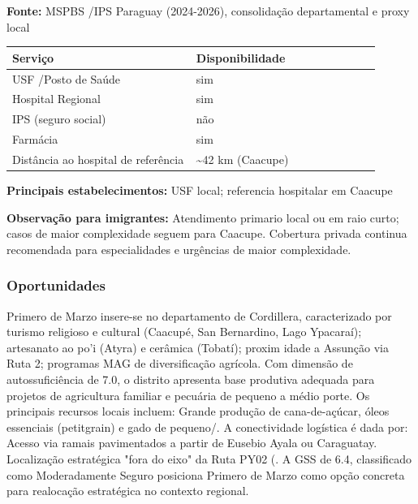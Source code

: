 \textbf{Fonte:} MSPBS /\allowbreak  IPS Paraguay (2024-2026), consolidação
departamental e proxy local

{\def\LTcaptype{none} %
\begin{longtable}{@{}>{\raggedright\arraybackslash}p{0.45\linewidth} >{\raggedright\arraybackslash}p{0.45\linewidth}@{}}
\toprule\noalign{}
Serviço & Disponibilidade \\
\midrule\noalign{}
\endhead
\bottomrule\noalign{}
\endlastfoot
USF /\allowbreak  Posto de Saúde & sim \\
Hospital Regional & sim \\
IPS (seguro social) & não \\
Farmácia & sim \\
Distância ao hospital de referência & \textasciitilde42 km (Caacupe) \\
\end{longtable}
}

\textbf{Principais estabelecimentos:} USF local; referencia hospitalar
em Caacupe

\textbf{Observação para imigrantes:} Atendimento primario local ou em
raio curto; casos de maior complexidade seguem para Caacupe. Cobertura
privada continua recomendada para especialidades e urgências de maior
complexidade.
\newpage

\subsubsection*{Oportunidades}\label{oport-primero-de-marzo-0315}
Primero de Marzo insere-se no departamento de Cordillera, caracterizado por turismo religioso e cultural (Caacupé, San Bernardino, Lago Ypacaraí); artesanato ao po'i (Atyra) e cerâmica (Tobatí); proxim idade a Assunção via Ruta 2; programas MAG de diversificação agrícola. Com dimensão de autossuficiência de 7.0, o distrito apresenta base produtiva adequada para projetos de agricultura familiar e pecuária de pequeno a médio porte. Os principais recursos locais incluem: Grande produção de cana-de-açúcar, óleos essenciais (petitgrain) e gado de pequeno/. A conectividade logística é dada por: Acesso via ramais pavimentados a partir de Eusebio Ayala ou Caraguatay. Localização estratégica "fora do eixo" da Ruta PY02 (. A GSS de 6.4, classificado como Moderadamente Seguro posiciona Primero de Marzo como opção concreta para realocação estratégica no contexto regional.

